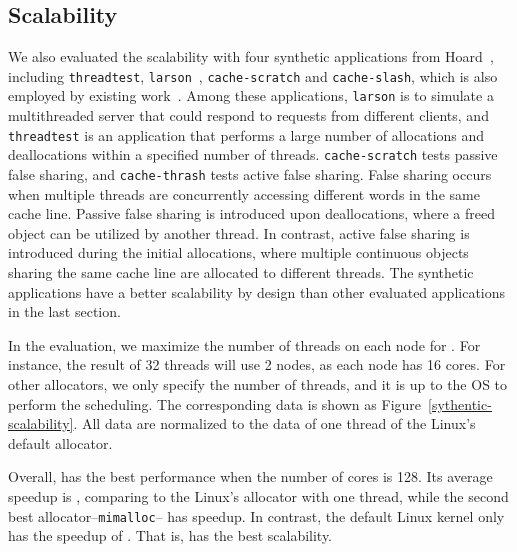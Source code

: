 \subsection{Scalability}
\label{sec:scale}

We also evaluated the scalability with four synthetic applications from Hoard~\citep{Hoard}, including \texttt{threadtest}, \texttt{larson}~\citep{Larson}, \texttt{cache-scratch} and \texttt{cache-slash}, which is also employed by existing work~\citep{Scalloc}. Among these applications, \texttt{larson} is to simulate a multithreaded server that could respond to requests from different clients, and \texttt{threadtest} is an application that performs a large number of allocations and deallocations within a specified number of threads. \texttt{cache-scratch} tests passive false sharing, and \texttt{cache-thrash} tests active false sharing. False sharing occurs when multiple threads are concurrently accessing different words in the same cache line. Passive false sharing is introduced upon deallocations, where a freed object can be utilized by another thread. In contrast, active false sharing is introduced during the initial allocations, where multiple continuous objects sharing the same cache line are allocated to different threads. The synthetic applications have a better scalability by design than other evaluated applications in the last section. 

In the evaluation, we maximize the number of threads on each node for \NM{}. For instance, the result of 32 threads will use 2 nodes, as each node has 16 cores. For other allocators, we only specify the number of threads, and it is up to the OS to perform the scheduling. The corresponding data is shown as Figure~\ref{sythentic-scalability}. All data are normalized to the data of one thread of the Linux's default allocator. 

Overall, \NM{} has the best performance when the number of cores is 128. Its average speedup is \toconfirm{$88\times$}, comparing to the Linux's allocator with one thread, while the second best allocator--\texttt{mimalloc}-- has \toconfirm{$75\times$} speedup. In contrast, the default Linux kernel only has the speedup of \toconfirm{$47\times$}. That is, \NM{} has the best scalability. 

